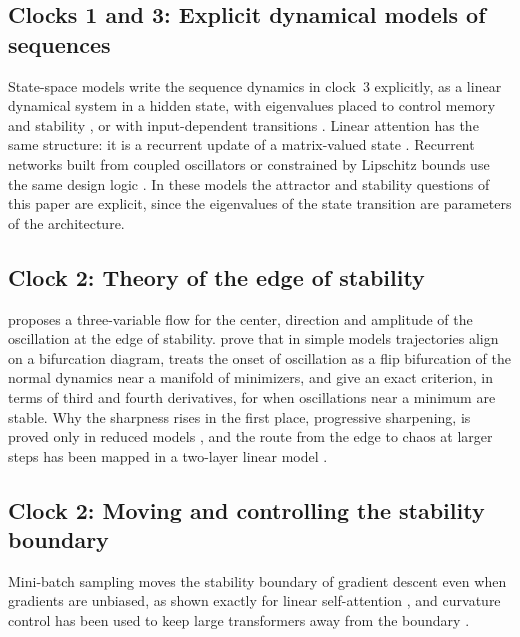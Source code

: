 \subsection{Clocks 1 and 3: Explicit dynamical models of sequences}

State-space models write the sequence dynamics in clock~3 explicitly, as a linear dynamical system in a hidden state, with eigenvalues placed to control memory and stability \citep{gu2021efficiently,orvieto2023resurrecting}, or with input-dependent transitions \citep{gu2023mamba}. Linear attention has the same structure: it is a recurrent update of a matrix-valued state \citep{katharopoulos2020transformers,schlag2021linear}. Recurrent networks built from coupled oscillators or constrained by Lipschitz bounds use the same design logic \citep{rusch2020coupled,erichson2020lipschitz}. In these models the attractor and stability questions of this paper are explicit, since the eigenvalues of the state transition are parameters of the architecture.

\subsection{Clock 2: Theory of the edge of stability}

\citet{marion2026edge} proposes a three-variable flow for the center, direction and amplitude of the oscillation at the edge of stability. \citet{song2023trajectory} prove that in simple models trajectories align on a bifurcation diagram, \citet{gan2026bifurcation} treats the onset of oscillation as a flip bifurcation of the normal dynamics near a manifold of minimizers, and \citet{mulayoff2026stability} give an exact criterion, in terms of third and fourth derivatives, for when oscillations near a minimum are stable. Why the sharpness rises in the first place, progressive sharpening, is proved only in reduced models \citep{agarwala2022secondorder}, and the route from the edge to chaos at larger steps has been mapped in a two-layer linear model \citep{kalra2023universal}.

\subsection{Clock 2: Moving and controlling the stability boundary}

Mini-batch sampling moves the stability boundary of gradient descent even when gradients are unbiased, as shown exactly for linear self-attention \citep{balasubramanian2026unbiased}, and curvature control has been used to keep large transformers away from the boundary \citep{ramasinghe2026taming,gilmer2021loss}.

